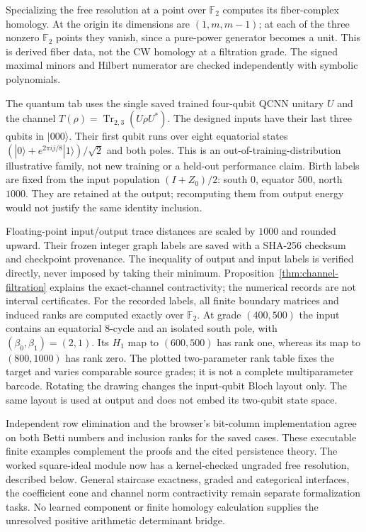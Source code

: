 \documentclass[11pt,oneside,openany]{book}
\theoremstyle{definition}\newtheorem{definition}[theorem]{Definition}
\theoremstyle{remark}\newtheorem{remark}[theorem]{Remark}
\begin{document}
Specializing the free resolution at a point over $\mathbb F_2$ computes
its fiber-complex homology. At the origin its dimensions are
$(1,m,m-1)$; at each of the three nonzero $\mathbb F_2$ points they vanish,
since a pure-power generator becomes a unit. This is derived fiber data,
not the CW homology at a filtration grade. The signed maximal minors and
Hilbert numerator are checked independently with symbolic polynomials.

The quantum tab uses the single saved trained four-qubit QCNN unitary $U$
and the channel $T(\rho)=\operatorname{Tr}_{2,3}(U\rho U^*)$.
The designed inputs have their last three qubits in $|000\rangle$.
Their first qubit runs over eight equatorial states
$(|0\rangle+e^{2\pi i j/8}|1\rangle)/\sqrt2$ and both poles.
This is an out-of-training-distribution illustrative family, not new
training or a held-out performance claim. Birth labels are fixed from the
input population $(I+Z_0)/2$: south $0$, equator $500$, north $1000$.
They are retained at the output; recomputing them from output energy
would not justify the same identity inclusion.

Floating-point input/output trace distances are scaled by $1000$ and
rounded upward. Their frozen integer graph labels are saved with a SHA-256
checksum and checkpoint provenance. The inequality of output and input
labels is verified directly, never imposed by taking their minimum.
Proposition~\ref{thm:channel-filtration} explains the exact-channel contractivity;
the numerical records are not interval certificates. For the recorded labels,
all finite boundary matrices and induced ranks are computed exactly over
$\mathbb F_2$. At grade $(400,500)$ the input contains an equatorial
8-cycle and an isolated south pole, with $(\beta_0,\beta_1)=(2,1)$.
Its $H_1$ map to $(600,500)$ has rank one, whereas its map to $(800,1000)$
has rank zero. The plotted two-parameter rank table fixes the target and
varies comparable source grades; it is not a complete multiparameter barcode.
Rotating the drawing changes the input-qubit Bloch layout only. The same
layout is used at output and does not embed its two-qubit state space.

Independent row elimination and the browser's bit-column implementation
agree on both Betti numbers and inclusion ranks for the saved cases.
These executable finite examples complement the proofs and the cited
persistence theory. The worked square-ideal module now has a kernel-checked ungraded
free resolution, described below. General staircase exactness, graded and
categorical interfaces, the coefficient cone and channel norm contractivity
remain separate formalization tasks. No learned
component or finite homology calculation supplies the unresolved positive
arithmetic determinant bridge.
\end{document}
